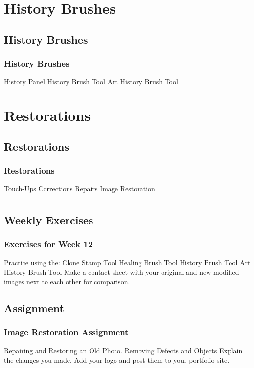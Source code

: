 \documentclass{beamer}
\begin{document}
	\section{History Brushes}
			\subsection{History Brushes}		
				\begin{frame}
					\frametitle{History Brushes}
					\begin{outline}
						\1 History Panel
						\1 History Brush Tool
						\1 Art History Brush Tool
					\end{outline}
				\end{frame}

	\section{Restorations}
			\subsection{Restorations}		
				\begin{frame}
					\frametitle{Restorations}
						\begin{outline}
							\1 Touch-Ups
							\1 Corrections
							\1 Repairs
							\1 Image Restoration
						\end{outline}
				\end{frame}
		
		
		\section{}
		
				\subsection{Weekly Exercises}		
	\begin{frame}
		\frametitle{Exercises for Week 12}
		\begin{outline}
			\1 Practice using the:  
			\2 Clone Stamp Tool
			\2 Healing Brush Tool
			\2 History Brush Tool
			\2 Art History Brush Tool
			\1 Make a contact sheet with your original and new modified images next to each other for comparison.
		\end{outline}
	\end{frame}

	\subsection{Assignment}		
	\begin{frame}
		\frametitle{Image Restoration Assignment}
		\begin{outline}
			\1 Repairing and Restoring an Old Photo.
			\1 Removing Defects and Objects
			\1 Explain the changes you made.
			\1 Add your logo and post them to your portfolio site.
		\end{outline}
	\end{frame}
\end{document}
